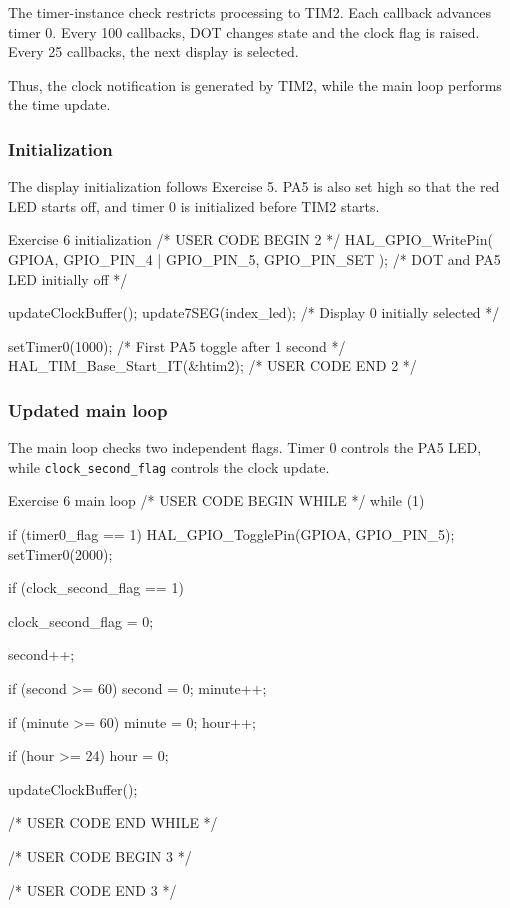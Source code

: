 \documentclass[a4paper]{article}
\begin{document}
The timer-instance check restricts processing
to TIM2. Each callback advances timer 0.
Every 100 callbacks, DOT changes state and
the clock flag is raised. Every 25 callbacks,
the next display is selected.

Thus, the clock notification is generated
by TIM2, while the main loop performs the
time update.

\subsubsection{Initialization}

The display initialization follows Exercise 5.
PA5 is also set high so that the red LED starts
off, and timer 0 is initialized before TIM2 starts.

\begin{stmcode}{Exercise 6 initialization}
/* USER CODE BEGIN 2 */
HAL_GPIO_WritePin(
    GPIOA, GPIO_PIN_4 | GPIO_PIN_5, GPIO_PIN_SET
);                         /* DOT and PA5 LED initially off */

updateClockBuffer();
update7SEG(index_led);      /* Display 0 initially selected */

setTimer0(1000);            /* First PA5 toggle after 1 second */
HAL_TIM_Base_Start_IT(&htim2);
/* USER CODE END 2 */
\end{stmcode}

\subsubsection{Updated main loop}

The main loop checks two independent flags.
Timer 0 controls the PA5 LED, while
\texttt{clock\_second\_flag} controls
the clock update.

\begin{stmcode}{Exercise 6 main loop}
/* USER CODE BEGIN WHILE */
while (1) {
  if (timer0_flag == 1) {
    HAL_GPIO_TogglePin(GPIOA, GPIO_PIN_5);
    setTimer0(2000);
  }

  if (clock_second_flag == 1) {
    clock_second_flag = 0;

    second++;

    if (second >= 60) {
      second = 0;
      minute++;
    }

    if (minute >= 60) {
      minute = 0;
      hour++;
    }

    if (hour >= 24) {
      hour = 0;
    }

    updateClockBuffer();
  }
    /* USER CODE END WHILE */

    /* USER CODE BEGIN 3 */
}
/* USER CODE END 3 */
\end{stmcode}
\end{document}
